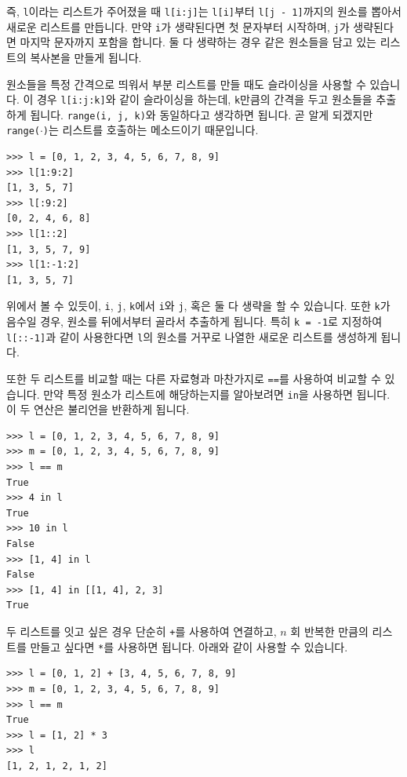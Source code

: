 \documentclass[../main.tex]{subfiles}
\begin{document}
즉, \texttt{l}이라는 리스트가 주어졌을 때 \texttt{l[i:j]}는 \texttt{l[i]}부터 \texttt{l[j - 1]}까지의 원소를 뽑아서 새로운 리스트를 만듭니다.
만약 \texttt{i}가 생략된다면 첫 문자부터 시작하며, \texttt{j}가 생략된다면 마지막 문자까지 포함을 합니다.
둘 다 생략하는 경우 같은 원소들을 담고 있는 리스트의 복사본을 만들게 됩니다.

원소들을 특정 간격으로 띄워서 부분 리스트를 만들 때도 슬라이싱을 사용할 수 있습니다.
이 경우 \texttt{l[i:j:k]}와 같이 슬라이싱을 하는데, \texttt{k}만큼의 간격을 두고 원소들을 추출하게 됩니다.
\texttt{range(i, j, k)}와 동일하다고 생각하면 됩니다.
곧 알게 되겠지만 \texttt{range($\cdot$)}는 리스트를 호출하는 메소드이기 때문입니다.
\begin{verbatim}
>>> l = [0, 1, 2, 3, 4, 5, 6, 7, 8, 9]
>>> l[1:9:2]
[1, 3, 5, 7]
>>> l[:9:2]
[0, 2, 4, 6, 8]
>>> l[1::2]
[1, 3, 5, 7, 9]
>>> l[1:-1:2]
[1, 3, 5, 7]
\end{verbatim}
위에서 볼 수 있듯이, \texttt{i}, \texttt{j}, \texttt{k}에서 \texttt{i}와 \texttt{j}, 혹은 둘 다 생략을 할 수 있습니다.
또한 \texttt{k}가 음수일 경우, 원소를 뒤에서부터 골라서 추출하게 됩니다.
특히 \texttt{k = -1}로 지정하여 \texttt{l[::-1]}과 같이 사용한다면 \texttt{l}의 원소를 거꾸로 나열한 새로운 리스트를 생성하게 됩니다.

또한 두 리스트를 비교할 때는 다른 자료형과 마찬가지로 \texttt{==}를 사용하여 비교할 수 있습니다.
만약 특정 원소가 리스트에 해당하는지를 알아보려면 \texttt{in}을 사용하면 됩니다.
이 두 연산은 불리언을 반환하게 됩니다.
\begin{verbatim}
>>> l = [0, 1, 2, 3, 4, 5, 6, 7, 8, 9]
>>> m = [0, 1, 2, 3, 4, 5, 6, 7, 8, 9]
>>> l == m
True
>>> 4 in l
True
>>> 10 in l
False
>>> [1, 4] in l
False
>>> [1, 4] in [[1, 4], 2, 3]
True
\end{verbatim}

두 리스트를 잇고 싶은 경우 단순히 \texttt{+}를 사용하여 연결하고, $n$ 회 반복한 만큼의 리스트를 만들고 싶다면 \texttt{*}를 사용하면 됩니다.
아래와 같이 사용할 수 있습니다.
\begin{verbatim}
>>> l = [0, 1, 2] + [3, 4, 5, 6, 7, 8, 9]
>>> m = [0, 1, 2, 3, 4, 5, 6, 7, 8, 9]
>>> l == m
True
>>> l = [1, 2] * 3
>>> l
[1, 2, 1, 2, 1, 2]
\end{verbatim}
\end{document}

